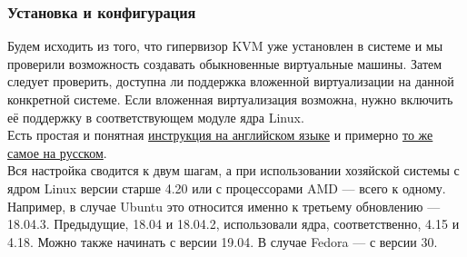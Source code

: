 \documentclass[14pt, a4paper]{article}
\begin{document}
\subsubsection*{Установка и конфигурация}

Будем исходить из того, что гипервизор KVM уже установлен в системе и мы проверили возможность
создавать обыкновенные виртуальные машины. Затем следует проверить, доступна ли поддержка
вложенной виртуализации на данной конкретной системе. Если вложенная виртуализация возможна,
нужно включить её поддержку в соответствующем модуле ядра Linux.\\

Есть простая и понятная \href{https://docs.fedoraproject.org/en-US/quick-docs/using-nested-virtualization-in-kvm/}{инструкция на английском языке} 
и примерно \href{https://bogachev.biz/2019/05/27/vklyuchenie-nested-virtualizacii-v-kvm/}{то же самое на русском}.\\

Вся настройка сводится к двум шагам, а при использовании хозяйской системы с ядром Linux версии
старше 4.20 или с процессорами AMD — всего к одному. Например, в случае Ubuntu это относится
именно к третьему обновлению — 18.04.3. Предыдущие, 18.04 и 18.04.2, использовали ядра,
соответственно, 4.15 и 4.18. Можно также начинать с версии 19.04. В случае Fedora — с версии 30.
\end{document}
